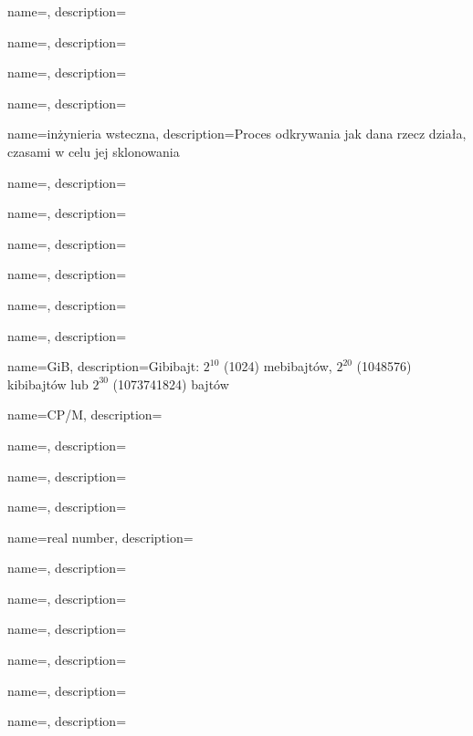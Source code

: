 {
  name={\PLph},
  description={\PLph}
}

{
  name={\PLph},
  description={\PLph}
}

{
  name={\PLph},
  description={\PLph}
}

{
  name={\PLph},
  description={\PLph}
}

{
  name={inżynieria wsteczna},
  description={Proces odkrywania jak dana rzecz działa, czasami w celu jej sklonowania}
}

{
  name={\PLph},
  description={\PLph}
}

{
  name={\PLph},
  description={\PLph}
}

{
  name={\PLph},
  description={\PLph}
}

{
  name={\PLph},
  description={\PLph}
}

{
  name={\PLph},
  description={\PLph}
}

{
  name={\PLph},
  description={\PLph}
}

{
  name=GiB,
  description={Gibibajt: $2^{10}$ (1024) mebibajtów, $2^{20}$ (1048576) kibibajtów lub $2^{30}$ (1073741824) bajtów}
}

{
  name=CP/M,
  description={\PLph}
}

{
  name={\PLph},
  description={\PLph}
}

{
  name={\PLph},
  description={\PLph}
}

{
  name={\PLph},
  description={\PLph}
}

{
  name={real number},
  description={\PLph}
}

{
  name={\PLph},
  description={\PLph}
}

{
  name={\PLph},
  description={\PLph}
}

{
  name={\PLph},
  description={\PLph}
}

{
  name={\PLph},
  description={\PLph}
}

{
  name={\PLph},
  description={\PLph}
}

{
  name={\PLph},
  description={\PLph}
}


